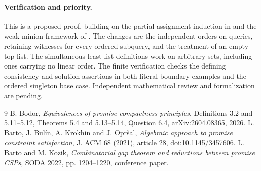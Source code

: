 \documentclass[11pt]{article}
\begin{document}
\paragraph{Verification and priority.}
This is a proposed proof, building on the partial-assignment induction in \cite{bbko,bodor} and the weak-minion framework of \cite{bk}. The changes are the independent orders on queries, retaining witnesses for every ordered subquery, and the treatment of an empty top list. The simultaneous least-list definitions work on arbitrary sets, including ones carrying no linear order. The finite verification checks the defining consistency and solution assertions in both literal boundary examples and the ordered singleton base case. Independent mathematical review and formalization are pending.
\begin{thebibliography}{9}
 B. Bodor, \emph{Equivalences of promise compactness principles}, Definitions 3.2 and 5.11--5.12, Theorems 5.4 and 5.13--5.14, Question 6.4, \href{https://arxiv.org/abs/2604.08365}{arXiv:2604.08365}, 2026.
 L. Barto, J. Bul\'in, A. Krokhin and J. Opr\v sal, \emph{Algebraic approach to promise constraint satisfaction}, J. ACM 68 (2021), article 28, \href{https://doi.org/10.1145/3457606}{doi:10.1145/3457606}.
 L. Barto and M. Kozik, \emph{Combinatorial gap theorem and reductions between promise CSPs}, SODA 2022, pp. 1204--1220, \href{https://doi.org/10.1137/1.9781611977073.50}{conference paper}.
\end{thebibliography}
\end{document}
